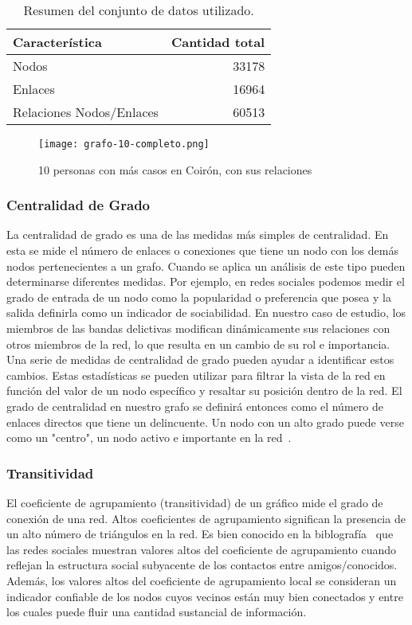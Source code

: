 \begin{table}
	\caption{Resumen del conjunto de datos utilizado.}\label{tab:EstadisticasResumidas}
	\centering
	\begin{tabular}{|l|r|}
		\hline
		\textbf{Característica} &  \textbf{Cantidad total} \\
		\hline
		Nodos &  33178 \\
		\hline
		Enlaces &  16964 \\
		\hline
		Relaciones Nodos/Enlaces &  60513 \\
		\hline
	\end{tabular}
\end{table}

\begin{figure}
	\texttt{[image: grafo-10-completo.png]}
	\caption{10 personas con más casos en Coirón, con sus relaciones} 
	\label{fig:grafoTop10}
\end{figure}

\subsubsection{Centralidad de Grado} La centralidad de grado es una de las medidas más simples de centralidad. En esta se mide el número de enlaces o conexiones que tiene un nodo con los demás nodos pertenecientes a un grafo. Cuando se aplica un análisis de este tipo pueden determinarse diferentes medidas. Por ejemplo, en redes sociales podemos medir el grado de entrada de un nodo como la popularidad o preferencia que posea y la salida definirla como un indicador de sociabilidad. En nuestro caso de estudio, los miembros de las bandas delictivas modifican dinámicamente sus relaciones con otros miembros de la red, lo que resulta en un cambio de su rol e importancia. Una serie de medidas de centralidad de grado pueden ayudar a identificar estos cambios. Estas estadísticas se pueden utilizar para filtrar la vista de la red en función del valor de un nodo específico y resaltar su posición dentro de la red. El grado de centralidad en nuestro grafo se definirá entonces como el número de enlaces directos que tiene un delincuente. Un nodo con un alto grado puede verse como un "centro", un nodo activo e importante en la red~\cite{ref_article32}.

\subsubsection{Transitividad} El coeficiente de agrupamiento (transitividad) de un gráfico mide el grado de conexión de una red. Altos coeficientes de agrupamiento significan la presencia de un alto número de triángulos en la red. Es bien conocido en la biblografía~\cite{ref_article34} que las redes sociales muestran valores altos del coeficiente de agrupamiento cuando reflejan la estructura social subyacente de los contactos entre amigos/conocidos. Además, los valores altos del coeficiente de agrupamiento local se consideran un indicador confiable de los nodos cuyos vecinos están muy bien conectados y entre los cuales puede fluir una cantidad sustancial de información.

